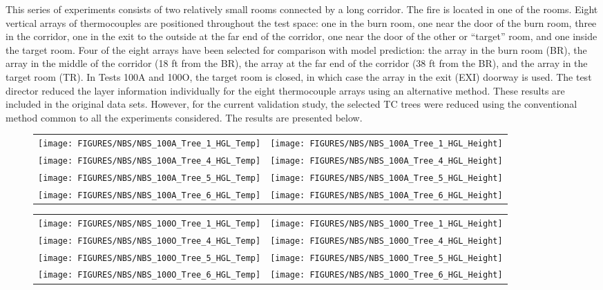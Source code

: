 This series of experiments consists of two relatively small rooms connected by a long corridor. The fire is located in one of the rooms.  Eight
vertical arrays of thermocouples are positioned throughout the test space: one in the burn room, one near the door of the burn room, three in the
corridor, one in the exit to the outside at the far end of the corridor, one near the door of the other or ``target'' room, and one inside the target
room.  Four of the eight arrays have been selected for comparison with model prediction: the array in the burn room (BR), the array in the middle of
the corridor (18 ft from the BR), the array at the far end of the corridor (38 ft from the BR), and the array in the target room (TR).  In Tests 100A
and 100O, the target room is closed, in which case the array in the exit (EXI) doorway is used. The test director reduced the layer information
individually for the eight thermocouple arrays using an alternative method. These results are included in the original data sets. However, for the
current validation study, the selected TC trees were reduced using the conventional method common to all the experiments considered.  The results are
presented below.

\newpage


\begin{figure}[p]
\begin{tabular*}{\textwidth}{l@{\extracolsep{\fill}}r}
\texttt{[image: FIGURES/NBS/NBS\_100A\_Tree\_1\_HGL\_Temp]} &
\texttt{[image: FIGURES/NBS/NBS\_100A\_Tree\_1\_HGL\_Height]} \\
\texttt{[image: FIGURES/NBS/NBS\_100A\_Tree\_4\_HGL\_Temp]} &
\texttt{[image: FIGURES/NBS/NBS\_100A\_Tree\_4\_HGL\_Height]} \\
\texttt{[image: FIGURES/NBS/NBS\_100A\_Tree\_5\_HGL\_Temp]} &
\texttt{[image: FIGURES/NBS/NBS\_100A\_Tree\_5\_HGL\_Height]} \\
\texttt{[image: FIGURES/NBS/NBS\_100A\_Tree\_6\_HGL\_Temp]} &
\texttt{[image: FIGURES/NBS/NBS\_100A\_Tree\_6\_HGL\_Height]}
\end{tabular*}
\end{figure}

\begin{figure}[p]
\begin{tabular*}{\textwidth}{l@{\extracolsep{\fill}}r}
\texttt{[image: FIGURES/NBS/NBS\_100O\_Tree\_1\_HGL\_Temp]} &
\texttt{[image: FIGURES/NBS/NBS\_100O\_Tree\_1\_HGL\_Height]} \\
\texttt{[image: FIGURES/NBS/NBS\_100O\_Tree\_4\_HGL\_Temp]} &
\texttt{[image: FIGURES/NBS/NBS\_100O\_Tree\_4\_HGL\_Height]} \\
\texttt{[image: FIGURES/NBS/NBS\_100O\_Tree\_5\_HGL\_Temp]} &
\texttt{[image: FIGURES/NBS/NBS\_100O\_Tree\_5\_HGL\_Height]} \\
\texttt{[image: FIGURES/NBS/NBS\_100O\_Tree\_6\_HGL\_Temp]} &
\texttt{[image: FIGURES/NBS/NBS\_100O\_Tree\_6\_HGL\_Height]}
\end{tabular*}
\end{figure}

